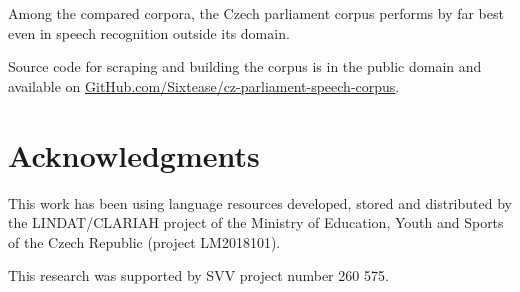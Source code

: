 \documentclass[conference]{IEEEtran}
\begin{document}
Among the compared corpora, the Czech parliament corpus performs by far best
even in speech recognition outside its domain.

Source code for scraping and building the corpus is in the public domain and
available on 
\url{GitHub.com/Sixtease/cz-parliament-speech-corpus}.

\section*{Acknowledgments}

This work has been using language resources developed, stored and distributed by
the LINDAT/CLARIAH project of the Ministry of Education, Youth and Sports of the
Czech Republic (project LM2018101).

This research was supported by SVV project number 260 575.



\end{document}
